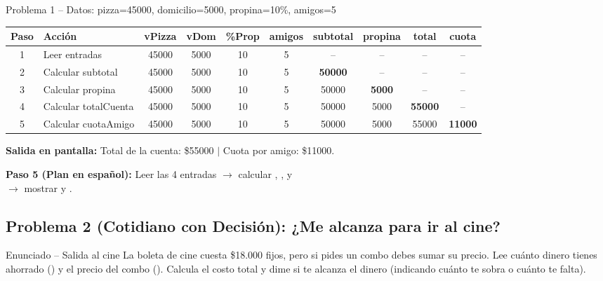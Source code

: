 \documentclass[11pt,letterpaper]{article}
\begin{document}
\begin{pruebaescritorio}{Problema 1 -- Datos: pizza=45000, domicilio=5000, propina=10\%, amigos=5}
\begin{center}
\footnotesize
\setlength{\tabcolsep}{4pt}
\renewcommand{\arraystretch}{1.25}
\begin{tabular}{c l c c c c c c c c}
  \toprule
  \textbf{Paso} & \textbf{Acción} & \textbf{vPizza} & \textbf{vDom} & \textbf{\%Prop} & \textbf{amigos} & \textbf{subtotal} & \textbf{propina} & \textbf{total} & \textbf{cuota} \\
  \midrule
  1 & Leer entradas & 45000 & 5000 & 10 & 5 & -- & -- & -- & -- \\
  2 & Calcular subtotal & 45000 & 5000 & 10 & 5 & \textbf{50000} & -- & -- & -- \\
  3 & Calcular propina & 45000 & 5000 & 10 & 5 & 50000 & \textbf{5000} & -- & -- \\
  4 & Calcular totalCuenta & 45000 & 5000 & 10 & 5 & 50000 & 5000 & \textbf{55000} & -- \\
  5 & Calcular cuotaAmigo & 45000 & 5000 & 10 & 5 & 50000 & 5000 & 55000 & \textbf{11000} \\
  \bottomrule
\end{tabular}
\end{center}
\textbf{Salida en pantalla:} Total de la cuenta: \$55000 $\mid$ Cuota por amigo: \$11000.
\end{pruebaescritorio}

\textbf{Paso 5 (Plan en español):} Leer las 4 entradas $\rightarrow$ calcular , ,  y\\
 $\rightarrow$ mostrar  y .

\subsection{Problema 2 (Cotidiano con Decisión): ¿Me alcanza para ir al cine?}
\begin{analisis}{Enunciado -- Salida al cine}
La boleta de cine cuesta \$18.000 fijos, pero si pides un combo debes sumar su precio. Lee cuánto dinero tienes ahorrado () y el precio del combo (). Calcula el costo total y dime si te alcanza el dinero (indicando cuánto te sobra o cuánto te falta).
\end{analisis}
\end{document}
